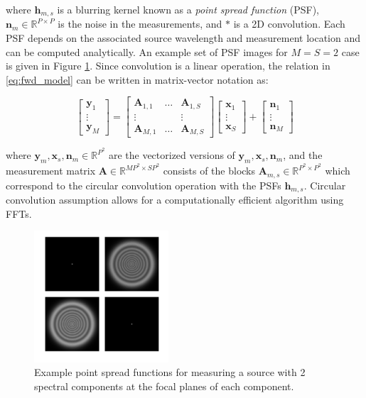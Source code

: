 \documentclass{article}
\renewcommand{\vec}[1]{\ensuremath{\mathbf{#1}}}
\providecommand{\vx}{\vec{x}}
\providecommand{\vy}{\vec{y}}
\providecommand{\vn}{\vec{n}}
\providecommand{\vA}{\vec{A}}
\begin{document}
where $\bm{h}_{m,s}$ is a blurring kernel known as a \emph{point spread
function} (PSF), $\bm n_m \in \mathbb R^{P \times P}$ is the noise in the
measurements, and $\ast$ is a 2D convolution. Each PSF depends on the associated
source wavelength and measurement location and can be computed analytically. An
example set of PSF images for $M=S=2$ case is given in Figure \ref{fig:psfs}.
Since convolution is a linear operation, the relation in \eqref{eq:fwd_model}
can be written in matrix-vector notation as:

\begin{equation}
\begin{bmatrix}\vy_1 \\ \vdots \\ \vy_M\end{bmatrix}
=
\begin{bmatrix}
  \vA_{1, 1} & \hdots & \vA_{1, S} \\
  \vdots & & \vdots \\
  \vA_{M, 1} & \hdots & \vA_{M, S}
\end{bmatrix}
\begin{bmatrix}\vx_1 \\ \vdots \\ \vx_S\end{bmatrix}
+
\begin{bmatrix}\vn_1 \\ \vdots \\ \vn_M\end{bmatrix}
\label{eq:forward_mtx}
\end{equation}

where $\vy_m, \vx_s, \vn_m \in \mathbb R^{P^2}$ are the vectorized
versions of $\bm y_m, \bm x_s, \bm n_m$, and the measurement matrix $\vA
\in \mathbb R^{MP^2 \times SP^2}$ consists of the blocks $\vA_{m,s} \in \mathbb
R^{P^2 \times P^2}$ which correspond to the circular
convolution operation with the PSFs $\bm h_{m,s}$. Circular convolution
assumption allows for a computationally efficient algorithm using FFTs.

\begin{figure}[htb]
  \begin{minipage}[b]{1\linewidth}
    \centering
    \centerline{\includegraphics[width=5cm]{psfs}}
  \end{minipage}
  \caption{Example point spread functions for measuring a source with 2 spectral
    components at the focal planes of each component.}
  \label{fig:psfs}
\end{figure}
\end{document}
